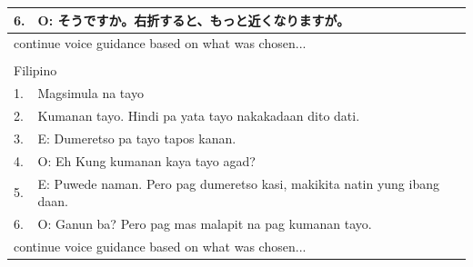 \begin{table}[h]
\begin{tabular}{ll}
        \multicolumn{1}{|l}{6.} & \multicolumn{1}{l|}{O: そうですか。右折すると、もっと近くなりますが。}                             \\ \hline
        \multicolumn{2}{l}{continue voice guidance based on what was chosen...}                               \\
                                &                                                                             \\ \hline
        \multicolumn{2}{l}{Filipino}                                                                          \\ \hline
        1.                      & Magsimula na tayo                                                           \\
        2.                      & Kumanan tayo. Hindi pa yata tayo nakakadaan dito dati.                      \\ \hline
        \multicolumn{1}{|l}{3.} & \multicolumn{1}{l|}{E: Dumeretso pa tayo tapos kanan.}                      \\
        \multicolumn{1}{|l}{4.} & \multicolumn{1}{l|}{O: Eh Kung kumanan kaya tayo agad?}                     \\
        \multicolumn{1}{|l}{5.} & \multicolumn{1}{l|}{E: Puwede naman. Pero pag dumeretso kasi, makikita natin yung ibang daan.} \\
        \multicolumn{1}{|l}{6.} & \multicolumn{1}{l|}{O: Ganun ba? Pero pag mas malapit na pag kumanan tayo.} \\ \hline
        \multicolumn{2}{l}{continue voice guidance based on what was chosen...}                               \\ \hline
    \end{tabular}
\end{table}